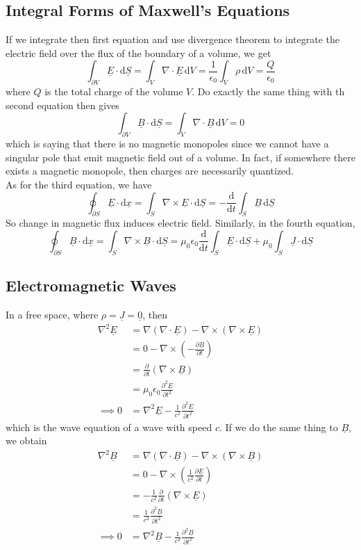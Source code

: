 \subsection{Integral Forms of Maxwell's Equations}
If we integrate then first equation and use divergence theorem to integrate the electric field over the flux of the boundary of a volume, we get
$$\int_{\partial V}\underline{E}\cdot\mathrm d\underline{S}=\int_V\nabla\cdot\underline{E}\,\mathrm dV=\frac{1}{\epsilon_0}\int_V\rho\,\mathrm dV=\frac{Q}{\epsilon_0}$$
where $Q$ is the total charge of the volume $V$.
Do exactly the same thing with th second equation then gives
$$\int_{\partial V}\underline{B}\cdot\mathrm d\underline{S}=\int_V\nabla\cdot\underline{B}\,\mathrm dV=0$$
which is saying that there is no magnetic monopoles since we cannot have a singular pole that emit magnetic field out of a volume.
In fact, if somewhere there exists a magnetic monopole, then charges are necessarily quantized.\\
As for the third equation, we have
$$\oint_{\partial S}\underline{E}\cdot\mathrm d\underline{x}=\int_S\nabla\times\underline{E}\cdot\mathrm d\underline{S}=-\frac{\mathrm d}{\mathrm dt}\int_S\underline{B}\,\mathrm d\underline{S}$$
So change in magnetic flux induces electric field.
Similarly, in the fourth equation,
$$\oint_{\partial S}\underline{B}\cdot\mathrm d\underline{x}=\int_S\nabla\times\underline{B}\cdot\mathrm d\underline{S}=\mu_0\epsilon_0\frac{\mathrm d}{\mathrm dt}\int_S\underline{E}\cdot\mathrm d\underline{S}+\mu_0\int_S\underline{J}\cdot\mathrm d\underline{S}$$
\subsection{Electromagnetic Waves}
In a free space, where $\rho=\underline{J}=\underline{0}$, then
\begin{align*}
    \nabla^2\underline{E}&=\nabla(\nabla\cdot\underline{E})-\nabla\times(\nabla\times\underline{E})\\
    &=0-\nabla\times\left(-\frac{\partial\underline{B}}{\partial t}\right)\\
    &=\frac{\partial}{\partial t}(\nabla\times\underline{B})\\
    &=\mu_0\epsilon_0\frac{\partial^2\underline{E}}{\partial t^2}\\
    \implies 0&=\nabla^2\underline{E}-\frac{1}{c^2}\frac{\partial^2\underline{E}}{\partial t^2}
\end{align*}
which is the wave equation of a wave with speed $c$.
If we do the same thing to $\underline{B}$, we obtain
\begin{align*}
    \nabla^2\underline{B}&=\nabla(\nabla\cdot\underline{B})-\nabla\times(\nabla\times\underline{B})\\
    &=0-\nabla\times\left(\frac{1}{c^2}\frac{\partial\underline{E}}{\partial t}\right)\\
    &=-\frac{1}{c^2}\frac{\partial}{\partial t}(\nabla\times\underline{E})\\
    &=\frac{1}{c^2}\frac{\partial^2\underline{B}}{\partial t^2}\\
    \implies 0&=\nabla^2\underline{B}-\frac{1}{c^2}\frac{\partial^2\underline{B}}{\partial t^2}
\end{align*}
